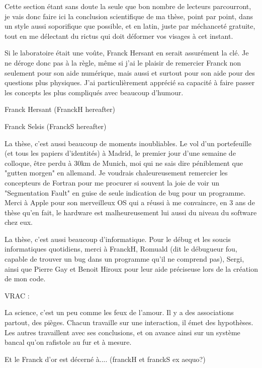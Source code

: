 Cette section étant sans doute la seule que bon nombre de lecteurs parcourront, je vais donc faire ici la conclusion scientifique de ma thèse, point par point, dans un style aussi soporifique que possible, et en latin, juste par méchanceté gratuite, tout en me délectant du rictus qui doit déformer vos visages à cet instant. 




Si le laboratoire était une voûte, Franck Hersant en serait assurément la clé. Je ne déroge donc pas à la règle, même si j'ai le plaisir de remercier Franck non seulement pour son aide numérique, mais aussi et surtout pour son aide pour des questions plus physiques. J'ai particulièrement apprécié sa capacité à faire passer les concepts les plus compliqués avec beaucoup d'humour.

Franck Hersant (FranckH hereafter)


Franck Selsis (FranckS hereafter)



La thèse, c'est aussi beaucoup de moments inoubliables. Le vol d'un portefeuille (et tous les papiers d'identités) à Madrid, le premier jour d'une semaine de colloque, être perdu à 30km de Munich, moi qui ne sais dire péniblement que "gutten morgen" en allemand. Je voudrais chaleureusement remercier les concepteurs de Fortran pour me procurer si souvent la joie de voir un "Segmentation Fault" en guise de seule indication de bug pour un programme. Merci à Apple pour son merveilleux OS qui a réussi à me convaincre, en 3 ans de thèse qu'en fait, le hardware est malheureusement lui aussi du niveau du software chez eux. 

La thèse, c'est aussi beaucoup d'informatique. Pour le débug et les soucis informatiques quotidiens, merci à FranckH, Romuald (dit le débugueur fou, capable de trouver un bug dans un programme qu'il ne comprend pas), Sergi, ainsi que Pierre Gay et Benoit Hiroux pour leur aide préciseuse lors de la création de mon code. 




VRAC : 

La science, c'est un peu comme les feux de l'amour. Il y a des associations partout, des pièges. Chacun travaille sur une interaction, il émet des hypothèses. Les autres travaillent avec ses conclusions, et on avance ainsi sur un système bancal qu'on rafistole au fur et à mesure.

Et le Franck d'or est décerné à.... (franckH et franckS ex aequo?)